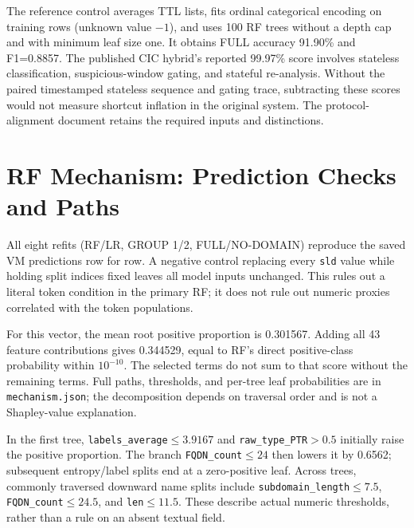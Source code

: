 \documentclass[conference]{IEEEtran}
\newcommand{\code}[1]{\texttt{#1}}
\begin{document}
\begin{table}[!htbp]
\caption{Reference-inventory single-stage RF on the same ROW split. This control uses all 41 supplied nonlabel fields before encoding; it is distinct from the primary 43-input baseline.}

\end{table}
The reference control averages TTL lists, fits ordinal categorical encoding on training rows (unknown value $-1$), and uses 100 RF trees without a depth cap and with minimum leaf size one. It obtains FULL accuracy 91.90\% and F1=0.8857. The published CIC hybrid's reported 99.97\% score involves stateless classification, suspicious-window gating, and stateful re-analysis. Without the paired timestamped stateless sequence and gating trace, subtracting these scores would not measure shortcut inflation in the original system. The protocol-alignment document retains the required inputs and distinctions.

\section{RF Mechanism: Prediction Checks and Paths}
All eight refits (RF/LR, GROUP 1/2, FULL/NO-DOMAIN) reproduce the saved VM predictions row for row. A negative control replacing every \code{sld} value while holding split indices fixed leaves all model inputs unchanged. This rules out a literal token condition in the primary RF; it does not rule out numeric proxies correlated with the token populations.

\begin{table}[!htbp]
\caption{Largest absolute path-score contributions for one common GROUP-2 RF false-negative input vector (original CSV row index 11; repeated 2,192 times among false negatives). Contributions average visited child-minus-parent positive proportions across trees.}

\end{table}
For this vector, the mean root positive proportion is 0.301567. Adding all 43 feature contributions gives 0.344529, equal to RF's direct positive-class probability within $10^{-10}$. The selected terms do not sum to that score without the remaining terms. Full paths, thresholds, and per-tree leaf probabilities are in \code{mechanism.json}; the decomposition depends on traversal order and is not a Shapley-value explanation.

In the first tree, \code{labels\_average}$\leq3.9167$ and \code{raw\_type\_PTR}$>0.5$ initially raise the positive proportion. The branch \code{FQDN\_count}$\leq24$ then lowers it by 0.6562; subsequent entropy/label splits end at a zero-positive leaf. Across trees, commonly traversed downward name splits include \code{subdomain\_length}$\leq7.5$, \code{FQDN\_count}$\leq24.5$, and \code{len}$\leq11.5$. These describe actual numeric thresholds, rather than a rule on an absent textual field.
\end{document}
